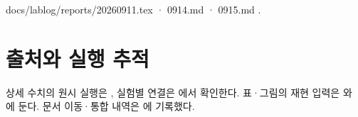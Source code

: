 docs/\allowbreak{}lablog/\allowbreak{}reports/\allowbreak{}20260911.tex · 0914.md · 0915.md .



\section*{출처와 실행 추적}

상세 수치의 원시 실행은 , 실험별 연결은 에서 확인한다. 표·그림의 재현 입력은 와 에 둔다. 문서 이동·통합 내역은 에 기록했다.


